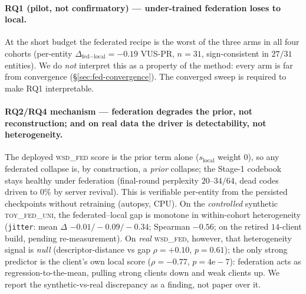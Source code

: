 \paragraph{RQ1 (pilot, not confirmatory) --- under-trained federation loses to local.}
At the short budget the federated recipe is the worst of the three arms in all four cohorts
(per-entity $\Delta_{\text{fed}-\text{local}}={-}0.19$ VUS-PR, $n{=}31$, sign-consistent in
$27/31$ entities). We do \emph{not} interpret this as a property of the method: every arm is
far from convergence (\S\ref{sec:fed-convergence}). The converged sweep is required to make
RQ1 interpretable.

\paragraph{RQ2/RQ4 mechanism --- federation degrades the prior, not reconstruction; and on
real data the driver is detectability, not heterogeneity.}
The deployed \textsc{wsd\_fed} score is the prior term alone ($s_{\mathrm{local}}$ weight
$0$), so any federated collapse is, by construction, a \emph{prior} collapse; the Stage-1
codebook stays healthy under federation (final-round perplexity $20$--$34/64$, dead codes
driven to $0\%$ by server revival). This is verifiable per-entity from the persisted
checkpoints without retraining (autopsy, CPU). On the \emph{controlled} synthetic
\textsc{toy\_fed\_uni}, the federated--local gap is monotone in within-cohort heterogeneity
(\texttt{jitter}: mean $\Delta$ ${-}0.01/{-}0.09/{-}0.34$; Spearman ${-}0.56$; on the retired
$14$-client build, pending re-measurement). On \emph{real}
\textsc{wsd\_fed}, however, that heterogeneity signal is \emph{null}
(descriptor-distance vs gap $\rho{=}{+}0.10$, $p{=}0.61$); the only strong predictor is the
client's own local score ($\rho{=}{-}0.77$, $p{=}4\mathrm{e}{-}7$): federation acts as
regression-to-the-mean, pulling strong clients down and weak clients up. We report the
synthetic-vs-real discrepancy as a finding, not paper over it.


